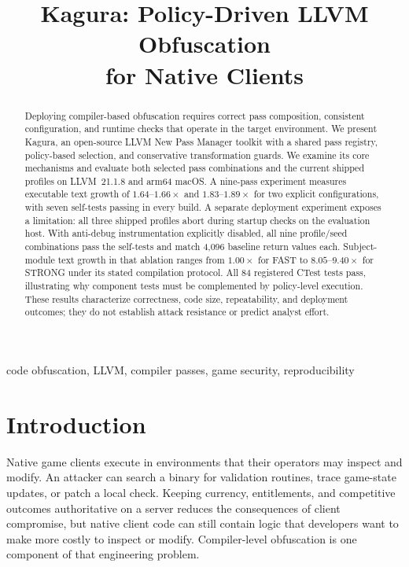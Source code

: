 \documentclass[conference]{IEEEtran}
\begin{document}
\title{Kagura: Policy-Driven LLVM Obfuscation\\for Native Clients}
\author{
}
\maketitle

\begin{abstract}
Deploying compiler-based obfuscation requires correct pass composition,
consistent configuration, and runtime checks that operate in the target
environment. We present Kagura, an open-source LLVM New Pass Manager
toolkit with a shared pass registry, policy-based selection, and conservative
transformation guards. We examine its core mechanisms and evaluate both
selected pass combinations and the current shipped profiles on LLVM~21.1.8
and arm64 macOS. A nine-pass experiment measures executable text growth
of $1.64$--$1.66\times$ and $1.83$--$1.89\times$ for two explicit
configurations, with seven self-tests passing in every build.
A separate deployment experiment exposes a limitation: all three shipped
profiles abort during startup checks on the evaluation host. With anti-debug
instrumentation explicitly disabled, all nine profile/seed combinations pass
the self-tests and match 4,096 baseline return values each. Subject-module
text growth in that ablation ranges from $1.00\times$ for FAST to
$8.05$--$9.40\times$ for STRONG under its stated compilation protocol.
All 84 registered CTest tests pass, illustrating why component tests must be
complemented by policy-level execution. These results characterize correctness,
code size, repeatability, and deployment outcomes; they do not establish
attack resistance or predict analyst effort.
\end{abstract}

\begin{IEEEkeywords}
code obfuscation, LLVM, compiler passes, game security, reproducibility
\end{IEEEkeywords}

\section{Introduction}
\label{sec:intro}

Native game clients execute in environments that their operators may
inspect and modify. An attacker can search a binary for validation
routines, trace game-state updates, or patch a local check. Keeping
currency, entitlements, and competitive outcomes authoritative on a
server reduces the consequences of client compromise, but native
client code can still contain logic that developers want to make more
costly to inspect or modify. Compiler-level obfuscation is one component
of that engineering problem.
\end{document}
